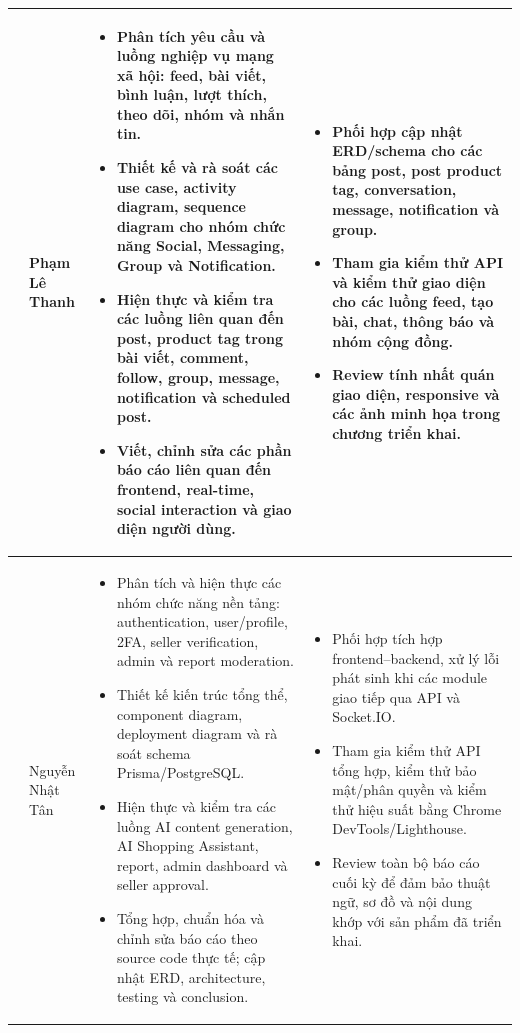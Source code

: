 {\begin{longtable}{|>{\centering\arraybackslash}p{}|>{\raggedright\arraybackslash}p{}|>{\raggedright\arraybackslash}p{}|>{\raggedright\arraybackslash}p{}|}
2 & Phạm Lê Thanh &
\begin{itemize}
    \item Phân tích yêu cầu và luồng nghiệp vụ mạng xã hội: feed, bài viết, bình luận, lượt thích, theo dõi, nhóm và nhắn tin.
    \item Thiết kế và rà soát các use case, activity diagram, sequence diagram cho nhóm chức năng Social, Messaging, Group và Notification.
    \item Hiện thực và kiểm tra các luồng liên quan đến post, product tag trong bài viết, comment, follow, group, message, notification và scheduled post.
    \item Viết, chỉnh sửa các phần báo cáo liên quan đến frontend, real-time, social interaction và giao diện người dùng.
\end{itemize}
&
\begin{itemize}
    \item Phối hợp cập nhật ERD/schema cho các bảng post, post product tag, conversation, message, notification và group.
    \item Tham gia kiểm thử API và kiểm thử giao diện cho các luồng feed, tạo bài, chat, thông báo và nhóm cộng đồng.
    \item Review tính nhất quán giao diện, responsive và các ảnh minh họa trong chương triển khai.
\end{itemize}
\\
\hline

3 & Nguyễn Nhật Tân &
\begin{itemize}
    \item Phân tích và hiện thực các nhóm chức năng nền tảng: authentication, user/profile, 2FA, seller verification, admin và report moderation.
    \item Thiết kế kiến trúc tổng thể, component diagram, deployment diagram và rà soát schema Prisma/PostgreSQL.
    \item Hiện thực và kiểm tra các luồng AI content generation, AI Shopping Assistant, report, admin dashboard và seller approval.
    \item Tổng hợp, chuẩn hóa và chỉnh sửa báo cáo theo source code thực tế; cập nhật ERD, architecture, testing và conclusion.
\end{itemize}
&
\begin{itemize}
    \item Phối hợp tích hợp frontend--backend, xử lý lỗi phát sinh khi các module giao tiếp qua API và Socket.IO.
    \item Tham gia kiểm thử API tổng hợp, kiểm thử bảo mật/phân quyền và kiểm thử hiệu suất bằng Chrome DevTools/Lighthouse.
    \item Review toàn bộ báo cáo cuối kỳ để đảm bảo thuật ngữ, sơ đồ và nội dung khớp với sản phẩm đã triển khai.
\end{itemize}
\\
\hline


\end{longtable}}

